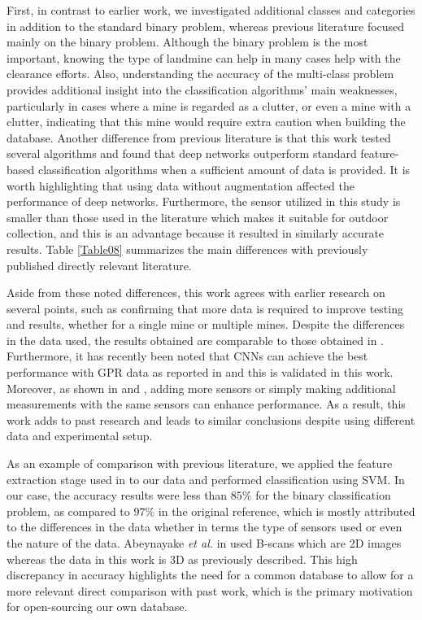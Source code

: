 \documentclass{ieeeaccess}
\begin{document}
First, in contrast to earlier work, we investigated additional classes and categories in addition to the standard binary problem, whereas previous literature focused mainly on the binary problem. Although the binary problem is the most important, knowing the type of landmine can help in many cases help with the clearance efforts. Also, understanding the accuracy of the multi-class problem provides additional insight into the classification algorithms' main weaknesses, particularly in cases where a mine is regarded as a clutter, or even a mine with a clutter, indicating that this mine would require extra caution when building the database. Another difference from previous literature is that this work tested several algorithms and found that deep networks outperform standard feature-based classification algorithms when a sufficient amount of data is provided. It is worth highlighting that using data without augmentation affected the performance of deep networks. Furthermore, the sensor utilized in this study is smaller than those used in the literature which makes it suitable for outdoor collection, and this is an advantage because it resulted in similarly accurate results. Table \ref{Table08} summarizes the main differences with previously published directly relevant literature.

Aside from these noted differences, this work agrees with earlier research on several points, such as confirming that more data is required to improve testing and results, whether for a single mine or multiple mines. Despite the differences in the data used, the results obtained are comparable to those obtained in \cite{Abeynayake2019}. Furthermore, it has recently been noted that CNNs can achieve the best performance with GPR data as reported in \cite{Ozkaya2021} and this is validated in this work. Moreover, as shown in \cite{Moalla2020} and \cite{Giovanneschi2019}, adding more sensors or simply making additional measurements with the same sensors can enhance performance. As a result, this work adds to past research and leads to similar conclusions despite using different data and experimental setup.

As an example of comparison with previous literature, we applied the feature extraction stage used in \cite{Abeynayake2019} to our data and performed classification using SVM. In our case, the accuracy results were less than $85\%$ for the binary classification problem, as compared to $97\%$ in the original reference, which is mostly attributed to the differences in the data whether in terms the type of sensors used or even the nature of the data. Abeynayake \textit{et al.} in \cite{Abeynayake2019} used B-scans which are 2D images whereas the data in this work is 3D as previously described. This high discrepancy in accuracy highlights the need for a common database to allow for a more relevant direct comparison with past work, which is the primary motivation for open-sourcing our own database.
\end{document}
